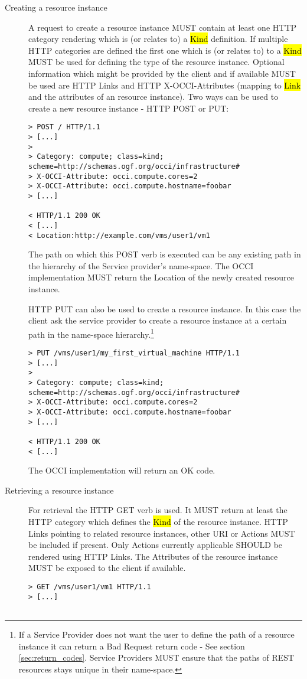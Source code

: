 \documentclass[10pt,a4paper]{article}
\begin{document}
\begin{description}
\item[Creating a resource instance] A request to create a resource
  instance MUST contain at least one HTTP category rendering which is
  (or relates to) a \hl{Kind} definition. If multiple HTTP categories
  are defined the first one which is (or relates to) to a \hl{Kind}
  MUST be used for defining the type of the resource
  instance. Optional information which might be provided by the client
  and if available MUST be used are HTTP Links and HTTP
  X-OCCI-Attributes (mapping to \hl{Link} and the attributes of an
  resource instance). Two ways can be used to create a new resource
  instance - HTTP POST or PUT:
\begin{verbatim}
> POST / HTTP/1.1
> [...]
> 
> Category: compute; class=kind; scheme=http://schemas.ogf.org/occi/infrastructure#
> X-OCCI-Attribute: occi.compute.cores=2
> X-OCCI-Attribute: occi.compute.hostname=foobar
> [...]
 
< HTTP/1.1 200 OK
< [...]
< Location:http://example.com/vms/user1/vm1
\end{verbatim}
  The path on which this POST verb is executed can be any existing
  path in the hierarchy of the Service provider's name-space. The OCCI
  implementation MUST return the Location of the newly created
  resource instance.

  HTTP PUT can also be used to create a resource instance. In this
  case the client ask the service provider to create a resource
  instance at a certain path in the name-space hierarchy.\footnote{If a
    Service Provider does not want the user to define the path of a
    resource instance it can return a Bad Request return code - See
    section \ref{sec:return_codes}. Service Providers MUST ensure that
    the paths of REST resources stays unique in their name-space.}
\begin{verbatim}
> PUT /vms/user1/my_first_virtual_machine HTTP/1.1
> [...]
> 
> Category: compute; class=kind; scheme=http://schemas.ogf.org/occi/infrastructure#
> X-OCCI-Attribute: occi.compute.cores=2
> X-OCCI-Attribute: occi.compute.hostname=foobar
> [...]
 
< HTTP/1.1 200 OK
< [...]
\end{verbatim}
  The OCCI implementation will return an OK code.

\item[Retrieving a resource instance] For retrieval the HTTP GET verb
  is used. It MUST return at least the HTTP category which defines the
  \hl{Kind} of the resource instance. HTTP Links pointing to related
  resource instances, other URI or Actions MUST be included if
  present. Only Actions currently applicable SHOULD be rendered using
  HTTP Links. The Attributes of the resource instance MUST be exposed
  to the client if available.
\begin{verbatim}
> GET /vms/user1/vm1 HTTP/1.1
> [...]
 

\end{verbatim}
\end{description}
\end{document}
